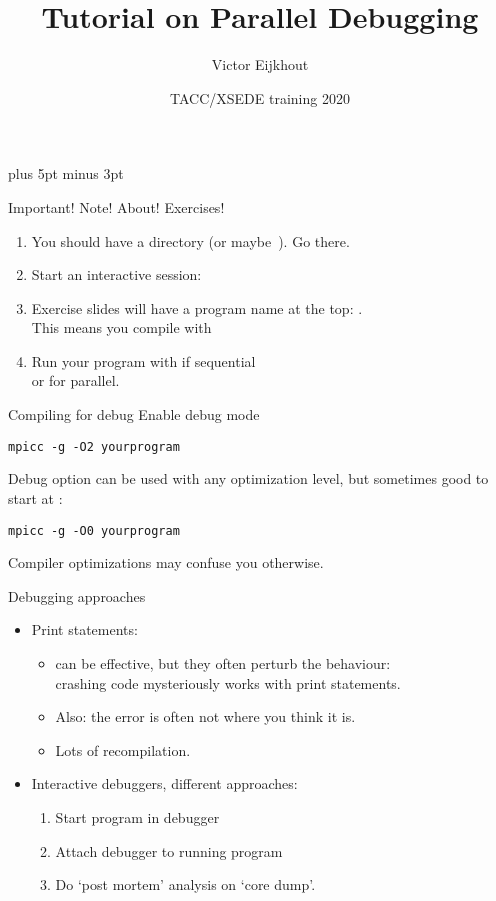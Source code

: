 \documentclass[11pt,headernav]{beamer}
\def\Location{}%
\def\Location{TACC/XSEDE training 2020}
\begin{document}
\parskip=10pt plus 5pt minus 3pt

\title{Tutorial on Parallel Debugging}
\author{Victor Eijkhout}
\date{\Location}

\begin{frame}
  \titlepage
\end{frame}

\begin{frame}[containsverbatim]{Important! Note! About! Exercises!}
  \begin{enumerate}
  \item You should have a directory  (or maybe~).
    Go there.
  \item Start an interactive session: 
  \item Exercise slides will have a program name at the top: \n{[roots]}.\\
    This means you compile with 
  \item Run your program with  if sequential\\
    or  for parallel.
  \end{enumerate}
\end{frame}

\begin{frame}[containsverbatim]{Compiling for debug}
Enable debug mode
\begin{verbatim}
mpicc -g -O2 yourprogram
\end{verbatim}
Debug option can be used with any optimization level, but
sometimes good to start at :
\begin{verbatim}
mpicc -g -O0 yourprogram
\end{verbatim}
Compiler optimizations may confuse you otherwise.
\end{frame}


\begin{frame}{Debugging approaches}
  \begin{itemize}
  \item Print statements:
    \begin{itemize}
    \item can be effective, but they often perturb the behaviour:\\
      crashing code mysteriously works with print statements.
    \item Also: the error is often not where you think it is.
    \item Lots of recompilation.
    \end{itemize}
  \item Interactive debuggers, different approaches:
    \begin{enumerate}
    \item Start program in debugger
    \item Attach debugger to running program
    \item Do `post mortem' analysis on `core dump'.
    \end{enumerate}
  \end{itemize}
\end{frame}
\end{document}
